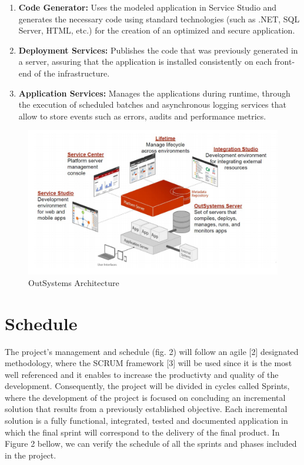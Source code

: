 \documentclass[a4paper,openright,12pt]{report}
\begin{document}
\begin{enumerate}
\item \textbf{Code Generator:} Uses the modeled application in Service Studio and generates the necessary code using standard technologies (such as .NET, SQL Server, HTML, etc.) for the creation of an optimized and secure application.
\item \textbf{ Deployment Services:} Publishes the code that was previously generated in a server, assuring that the application is installed consistently on each front-end of the infrastructure.
\item  \textbf{Application Services:} Manages the applications during runtime, through the execution of scheduled batches and asynchronous logging services that allow to store events such as errors, audits and performance metrics.
\end{enumerate}

\begin{figure}[H]
  \includegraphics[width=\linewidth]{./figures/Architecture.png}
  \caption{OutSystems Architecture}\label{fig:architecture}
\end{figure}

\section*{Schedule} 

The project's management and schedule (fig. 2) will follow an agile [2] designated methodology, where the SCRUM framework [3] will be used since it is the most well referenced and it enables to increase the productivty and quality of the development. Consequently, the project will be divided in cycles called Sprints, where the development of the project is focused on concluding an incremental solution that results from a previously established objective. Each incremental solution  is a fully functional, integrated, tested and documented application in which the final sprint will correspond to the delivery of the final product. In Figure 2 bellow, we can verify the schedule of all the sprints and phases included in the project.
\end{document}
